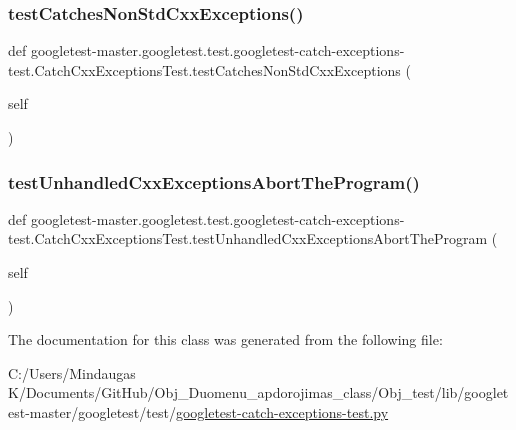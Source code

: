 \subsubsection{\texorpdfstring{testCatchesNonStdCxxExceptions()}{testCatchesNonStdCxxExceptions()}}
{\footnotesize\ttfamily def googletest-\/master.\+googletest.\+test.\+googletest-\/catch-\/exceptions-\/test.\+Catch\+Cxx\+Exceptions\+Test.\+test\+Catches\+Non\+Std\+Cxx\+Exceptions (\begin{DoxyParamCaption}\item[{}]{self }\end{DoxyParamCaption})}

\mbox{\label{classgoogletest-master_1_1googletest_1_1test_1_1googletest-catch-exceptions-test_1_1_catch_cxx_exceptions_test_ab6d7996b774c0be213c4803789c628b3}} 
\subsubsection{\texorpdfstring{testUnhandledCxxExceptionsAbortTheProgram()}{testUnhandledCxxExceptionsAbortTheProgram()}}
{\footnotesize\ttfamily def googletest-\/master.\+googletest.\+test.\+googletest-\/catch-\/exceptions-\/test.\+Catch\+Cxx\+Exceptions\+Test.\+test\+Unhandled\+Cxx\+Exceptions\+Abort\+The\+Program (\begin{DoxyParamCaption}\item[{}]{self }\end{DoxyParamCaption})}



The documentation for this class was generated from the following file\+:\begin{DoxyCompactItemize}
\item 
C\+:/\+Users/\+Mindaugas K/\+Documents/\+Git\+Hub/\+Obj\+\_\+\+Duomenu\+\_\+apdorojimas\+\_\+class/\+Obj\+\_\+test/lib/googletest-\/master/googletest/test/\mbox{\hyperlink{_obj__test_2lib_2googletest-master_2googletest_2test_2googletest-catch-exceptions-test_8py}{googletest-\/catch-\/exceptions-\/test.\+py}}\end{DoxyCompactItemize}
